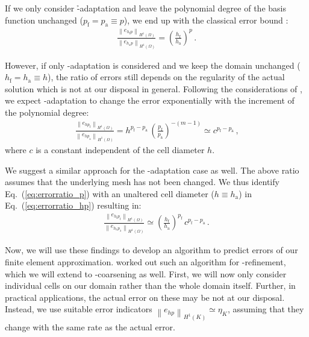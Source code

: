 If we only consider \h-adaptation and leave the polynomial degree of the basis function unchanged ($p_\text{f} = p_\text{a} \equiv p$), we end up with the classical error bound :
\begin{align}
\label{eq:errorratio_h} \frac{\left\|e_{h_\text{f} p}\right\|_{H^{1}(\Omega)}}{\left\|e_{h_\text{a} p}\right\|_{H^{1}(\Omega)}} = \left( \frac{h_\text{f}}{h_\text{a}} \right)^p \,\text{.}
\end{align}

However, if only \p-adaptation is considered and we keep the domain unchanged ($h_\text{f} = h_\text{a} \equiv h$), the ratio of errors still depends on the regularity of the actual solution which is not at our disposal in general. Following the considerations of \cite{melenk2001}, we expect \p-adaptation to change the error exponentially with the increment of the polynomial degree:
\begin{align}
\label{eq:errorratio_p} \frac{\left\|e_{h p_\text{f}}\right\|_{H^{1}(\Omega)}}{\left\|e_{h p_\text{a}}\right\|_{H^{1}(\Omega)}} = h^{p_\text{f} - p_\text{a}} \, \left(\frac{p_\text{f}}{p_\text{a}}\right)^{-(m-1)} \simeq c^{p_\text{f} - p_\text{a}} \,\text{,}
\end{align}
where $c$ is a constant independent of the cell diameter $h$.

We suggest a similar approach for the \hp-adaptation case as well. The above ratio assumes that the underlying mesh has not been changed. We thus identify Eq.~(\ref{eq:errorratio_p}) with an unaltered cell diameter ($h \equiv h_\text{a}$) in Eq.~(\ref{eq:errorratio_hp}) resulting in:
\begin{align}
\label{eq:errorratio_hp_exp} \frac{\left\|e_{h_\text{f} p_\text{f}}\right\|_{H^{1}(\Omega)}}{\left\|e_{h_\text{a} p_\text{a}}\right\|_{H^{1}(\Omega)}} \simeq \left( \frac{h_\text{f}}{h_\text{a}} \right)^{p_\text{f}} \, c^{p_\text{f} - p_\text{a}} \,\text{.}
\end{align}

Now, we will use these findings to develop an algorithm to predict errors of our finite element approximation. \textcite{melenk2001} worked out such an algorithm for \hp-refinement, which we will extend to \hp-coarsening as well. First, we will now only consider individual cells on our domain rather than the whole domain itself. Further, in practical applications, the actual error on these may be not at our disposal. Instead, we use suitable error indicators $\left\|e_{hp}\right\|_{H^{1}(K)} \simeq \eta_K$, assuming that they change with the same rate as the actual error.

